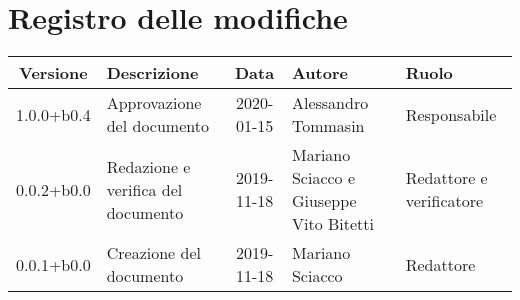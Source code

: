 \section*{Registro delle modifiche}

\begin{center}
	\begin{longtable}{|c|p{3.5cm}|c|p{3cm}|p{3cm}|}
		\hline
		\rowcolor{lighter-grayer}
		\textbf{Versione} & \textbf{Descrizione} & \textbf{Data} & \textbf{Autore} & \textbf{Ruolo} \\
		\hline
		\endfirsthead


	1.0.0+b0.4 & Approvazione del documento & 2020-01-15 & Alessandro Tommasin & Responsabile \\
	\hline
	0.0.2+b0.0 & Redazione e verifica del documento & 2019-11-18 & Mariano Sciacco e Giuseppe Vito Bitetti & Redattore e verificatore \\
	\hline
	0.0.1+b0.0 & Creazione del documento & 2019-11-18 & Mariano Sciacco & Redattore \\
	\hline

	\end{longtable}
\end{center}
